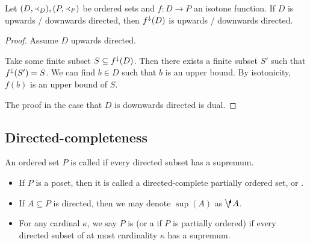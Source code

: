 \begin{proposition} \label{imageDirectedSet}
Let $\sSet{D,\Yleft_D}, \sSet{P,\Yleft_P}$ be ordered sets and $f: D\to P$ an isotone function. If $D$ is upwards / downwards directed, then $f^{\downarrow}(D)$ is upwards / downwards directed.
\end{proposition}
\begin{proof}
Assume $D$ upwards directed.

Take some finite subset $S\subseteq f^\downarrow(D)$. Then there exists a finite subset $S'$ such that $f^\downarrow(S') = S$. We can find $b\in D$ such that $b$ is an upper bound. By isotonicity, $f(b)$ is an upper bound of $S$.

The proof in the case that $D$ is downwards directed is dual.
\end{proof}

\subsection{Directed-completeness}
\begin{definition}
An ordered set $P$ is called  if every directed subset has a supremum.
\begin{itemize}
\item If $P$ is a poset, then it is called a directed-complete partially ordered set, or .
\item If $A \subseteq P$ is directed, then we may denote $\sup(A)$ as $\dirvee A$.
\item For any cardinal $\kappa$, we say $P$ is  (or a  if $P$ is partially ordered) if every directed subset of at most cardinality $\kappa$ has a supremum.
\end{itemize}
\end{definition}

